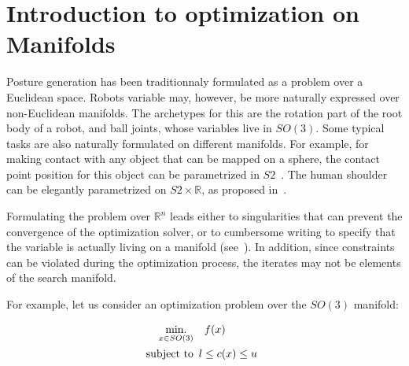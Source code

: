 
\section{Introduction to optimization on Manifolds}
\label{sec:introduction_to_optimization_on_manifolds}

Posture generation has been traditionnaly formulated as a problem over a Euclidean space.
Robots variable may, however, be more naturally expressed over non-Euclidean manifolds.
The archetypes for this are the rotation part of the root body of a robot, and ball joints, whose variables live in $SO(3)$.
Some typical tasks are also naturally formulated on different manifolds.
For example, for making contact with any object that can be mapped on a sphere, the contact point position for this object can be parametrized in $S2$~\cite{escande:icra:2016}.
The human shoulder can be elegantly parametrized on $S2\times\mathbb{R}$, as proposed in~\cite{baerlocher}.

Formulating the problem over $\mathbb{R}^n$ leads either to singularities that can prevent the convergence of the optimization solver, or to cumbersome writing to specify that the variable is actually living on a manifold (see~\cite{bouyarmane:humanoids:2012}).
In addition, since constraints can be violated during the optimization process, the iterates may not be elements of the search manifold.

For example, let us consider an optimization problem over the $SO(3)$ manifold:

\begin{align}
\label{eq:pb_on_SO3}
  \operatorname*{min.}_{x \in SO(3)} & \quad f(x)\\
  \text{subject to}&
  \begin{array}{lr}
    l \leq c(x) \leq u \nonumber
  \end{array}
\end{align}

